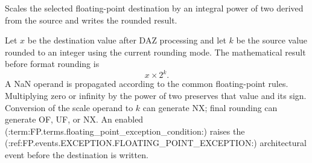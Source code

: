 Scales the selected floating-point destination by an integral power of two derived from the source and writes the rounded result.

Let \(x\) be the destination value after DAZ processing and let \(k\) be the source value rounded to an integer using the current rounding mode. The mathematical result before format rounding is
\[
  x \times 2^k .
\]
A NaN operand is propagated according to the common floating-point rules. Multiplying zero or infinity by the power of two preserves that value and its sign. Conversion of the scale operand to \(k\) can generate NX; final rounding can generate OF, UF, or NX. An enabled (:term:FP.terms.floating_point_exception_condition:) raises the (:ref:FP.events.EXCEPTION.FLOATING_POINT_EXCEPTION:) architectural event before the destination is written.
